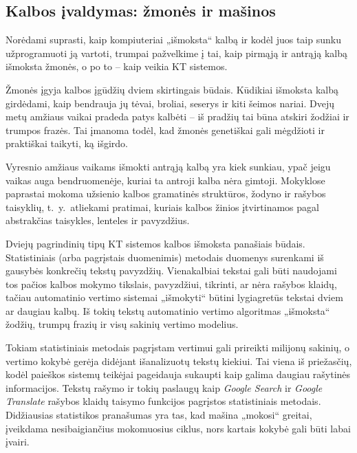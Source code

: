 \begin{multicols}{2}
\subsection{Kalbos įvaldymas: žmonės ir mašinos}

Norėdami suprasti, kaip kompiuteriai „išmoksta“ kalbą ir kodėl juos taip sunku užprogramuoti ją vartoti, trumpai pažvelkime į tai, kaip pirmąją ir antrąją kalbą išmoksta žmonės, o po to – kaip veikia KT sistemos.


Žmonės įgyja kalbos įgūdžių dviem skirtingais būdais. Kūdikiai išmoksta kalbą girdėdami, kaip bendrauja jų tėvai, broliai, seserys ir kiti šeimos nariai. Dvejų metų amžiaus vaikai pradeda patys kalbėti – iš pradžių tai būna atskiri žodžiai ir trumpos frazės. Tai įmanoma  todėl, kad žmonės  genetiškai gali mėgdžioti ir praktiškai taikyti, ką išgirdo.

Vyresnio amžiaus vaikams išmokti antrąją kalbą yra kiek sunkiau, ypač jeigu vaikas auga bendruomenėje, kuriai ta antroji kalba nėra gimtoji. Mokyklose paprastai mokoma užsienio kalbos gramatinės struktūros, žodyno ir rašybos taisyklių, t.~y.~atliekami pratimai, kuriais kalbos žinios įtvirtinamos pagal abstrakčias taisykles, lenteles ir pavyzdžius. 

Dviejų pagrindinių tipų KT sistemos kalbos išmoksta panašiais būdais. Statistiniais (arba pagrįstais duomenimis) metodais duomenys surenkami iš gausybės konkrečių tekstų pavyzdžių. Vienakalbiai tekstai gali būti naudojami tos pačios kalbos mokymo tikslais, pavyzdžiui, tikrinti, ar nėra rašybos klaidų, tačiau automatinio vertimo sistemai „išmokyti“ būtini lygiagretūs tekstai dviem ar daugiau kalbų. Iš tokių tekstų automatinio vertimo algoritmas „išmoksta“ žodžių, trumpų frazių ir visų sakinių vertimo modelius. 

Tokiam statistiniais metodais pagrįstam vertimui gali prireikti milijonų sakinių, o vertimo kokybė gerėja didėjant išanalizuotų tekstų kiekiui. Tai viena iš priežasčių, kodėl paieškos sistemų teikėjai pageidauja sukaupti kaip galima daugiau rašytinės informacijos. Tekstų rašymo ir tokių paslaugų kaip \textit{Google Search} ir \textit{Google Translate} rašybos klaidų taisymo funkcijos pagrįstos statistiniais metodais. Didžiausias statistikos pranašumas yra tas, kad mašina „mokosi“ greitai, įveikdama nesibaigiančius mokomuosius ciklus, nors kartais kokybė gali būti labai įvairi.


\end{multicols}
